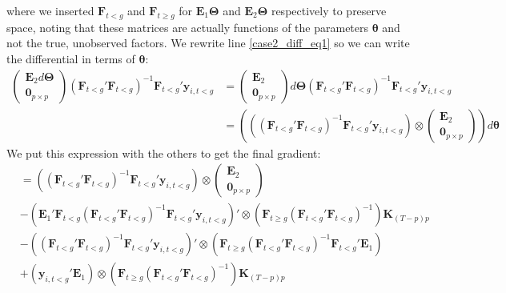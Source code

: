 \documentclass[12pt]{article}
\begin{document}
where we inserted $\bm F_{t < g}$ and $\bm F_{t \geq g}$ for $\bm E_1 \bm \Theta$ and $\bm E_2 \bm \Theta$ respectively to preserve space, noting that these matrices are actually functions of the parameters $\bm \theta$ and not the true, unobserved factors. We rewrite line \eqref{case2_diff_eq1} so we can write the differential in terms of $\bm \theta$: 
\begin{align}
    \begin{pmatrix}
        \bm E_2 d \bm \Theta\\
        \bm 0_{p \times p}
    \end{pmatrix}
    \left( \bm F_{t < g}' \bm F_{t < g} \right)^{-1} \bm F_{t < g}' \bm y_{i, t < g} 
    &= 
    \begin{pmatrix}
        \bm E_2\\
        \bm 0_{p \times p}
    \end{pmatrix}
    d \bm \Theta
    \left( \bm F_{t < g}' \bm F_{t < g} \right)^{-1} \bm F_{t < g}' \bm y_{i, t < g}\\
    &=
    \left( \left( \left( \bm F_{t < g}' \bm F_{t < g} \right)^{-1} \bm F_{t < g}' \bm y_{i, t < g} \right) \otimes 
        \begin{pmatrix}
        \bm E_2\\
        \bm 0_{p \times p}
    \end{pmatrix}
    \right)
    d \bm \theta
\end{align}
We put this expression with the others to get the final gradient: 
\begin{align}
    &= \left( \left( \bm F_{t < g}' \bm F_{t < g} \right)^{-1} \bm F_{t < g}' \bm y_{i, t < g} \right) \otimes 
        \begin{pmatrix}
        \bm E_2\\
        \bm 0_{p \times p}
    \end{pmatrix}\\
    &
    - \left( \bm E_1' \bm F_{t < g} \left( \bm F_{t < g}' \bm F_{t < g} \right)^{-1} \bm F_{t < g}' \bm y_{i,t < g} \right)' \otimes \left( \bm F_{t \geq g} \left( \bm F_{t < g}' \bm F_{t < g} \right)^{-1} \right) \bm K_{(T-p)p}\\
    &
    - \left( \left( \bm F_{t < g}' \bm F_{t < g} \right)^{-1} \bm F_{t < g}' \bm y_{i,t < g} \right)' \otimes \left( \bm F_{t \geq g} \left( \bm F_{t < g}' \bm F_{t < g} \right)^{-1} \bm F_{t < g}' \bm E_1 \right)\\
    &
    + \left( \bm y_{i,t < g}' \bm E_1 \right) \otimes \left( \bm F_{t \geq g} \left( \bm F_{t < g}' \bm F_{t < g} \right)^{-1} \right) \bm K_{(T-p)p}
\end{align}
\end{document}
